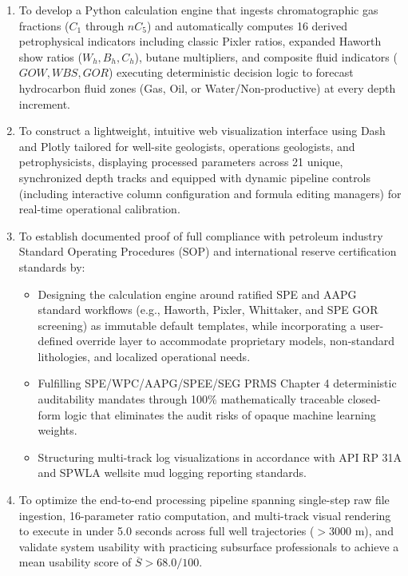 \begin{enumerate}
    \item To develop a Python calculation engine that ingests chromatographic gas fractions ($C_1$ through $nC_5$) and automatically computes 16 derived petrophysical indicators including classic Pixler ratios, expanded Haworth show ratios ($W_h, B_h, C_h$), butane multipliers, and composite fluid indicators ($GOW, WBS, GOR$) executing deterministic decision logic to forecast hydrocarbon fluid zones (Gas, Oil, or Water/Non-productive) at every depth increment.
    
    \item To construct a lightweight, intuitive web visualization interface using Dash and Plotly tailored for well-site geologists, operations geologists, and petrophysicists, displaying processed parameters across 21 unique, synchronized depth tracks and equipped with dynamic pipeline controls (including interactive column configuration and formula editing managers) for real-time operational calibration.
    
    \item To establish documented proof of full compliance with petroleum industry Standard Operating Procedures (SOP) and international reserve certification standards by:
    \begin{itemize}
        \item Designing the calculation engine around ratified SPE and AAPG standard workflows (e.g., Haworth, Pixler, Whittaker, and SPE GOR screening) as immutable default templates, while incorporating a user-defined override layer to accommodate proprietary models, non-standard lithologies, and localized operational needs.
        \item Fulfilling SPE/WPC/AAPG/SPEE/SEG PRMS Chapter 4 deterministic auditability mandates \citep{ref2, ref3} through 100\% mathematically traceable closed-form logic that eliminates the audit risks of opaque machine learning weights.
        \item Structuring multi-track log visualizations in accordance with API RP 31A and SPWLA wellsite mud logging reporting standards.
    \end{itemize}
    
    \item To optimize the end-to-end processing pipeline spanning single-step raw file ingestion, 16-parameter ratio computation, and multi-track visual rendering to execute in under 5.0 seconds across full well trajectories ($> 3000\text{ m}$), and validate system usability with practicing subsurface professionals to achieve a mean usability score of $\overline{S} > 68.0/100$.
\end{enumerate}


